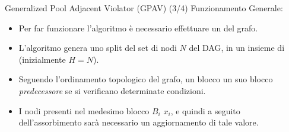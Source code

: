 \documentclass[9pt]{beamer}
\begin{document}
\begin{tframe}{Generalized Pool Adjacent Violator (GPAV) (3/4)}
Funzionamento Generale:
\begin{itemize}
\item Per far funzionare l'algoritmo è necessario effettuare un  del grafo.
\item L’algoritmo genera uno split del set di nodi $N$ del DAG, in un insieme di  (inizialmente $H = N$).
\item Seguendo l'ordinamento topologico del grafo, un blocco  un suo blocco \emph{predecessore} se si verificano determinate condizioni.
\item I nodi presenti nel medesimo blocco $B_i$  $x_i$, e quindi a seguito dell'assorbimento sarà necessario un aggiornamento di tale valore.
\end{itemize}
\end{tframe}

\end{document}

